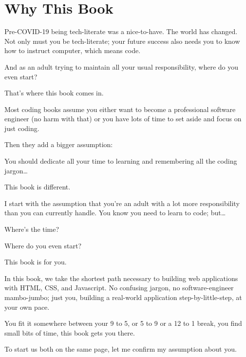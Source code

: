 \section{Why This Book}\label{sec:why-this-book}

Pre-COVID-19 being tech-literate was a nice-to-have.
The world has changed.
Not only must you be tech-literate;
your future success also needs you to know how to instruct computer, which means code.

And as an adult trying to maintain all your usual responsibility, where do you even start?

That's where this book comes in.

Most coding books assume you either want to become a professional software engineer
(no harm with that) or you have lots of time to set aside and focus on just coding.

Then they add a bigger assumption:

You should dedicate all your time to learning and remembering all the coding jargon…

This book is different.

I start with the assumption that you're an adult with a lot more responsibility than you can currently handle.
You know you need to learn to code; but\ldots

Where's the time?

Where do you even start?

This book is for you.

In this book, we take the shortest path necessary to building web applications with HTML, CSS, and Javascript.
No confusing
jargon, no software-engineer mambo-jumbo; just you, building a real-world application step-by-little-step, at your own
pace.

You fit it somewhere between your 9 to 5, or 5 to 9 or a 12 to 1 break, you find small bits of time, this book gets you there.

To start us both on the same page, let me confirm my assumption about you.

